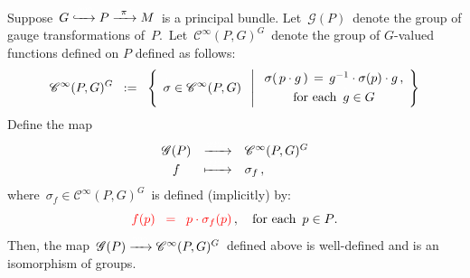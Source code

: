\vskip 0.5cm
\begin{proposition}
\mbox{}
\vskip -0.05cm
\noindent
Suppose
\,$G \xhookrightarrow{{\color{white}222}} P \xrightarrow{{\color{white}2}\pi{\color{white}2}} M$\,
is a principal bundle.
Let \,$\mathscr{G}(P)$\, denote the group of gauge transformations of \,$P$.\,
Let \,$\mathscr{C}^{\infty}(P,G)^{G}$\, denote the group of $G$-valued functions
defined on $P$ defined as follows:
\begin{equation*}
\mathscr{C}^{\infty}(P,G)^{G}
\;\; := \;\;
	\left\{\;\,
		\overset{{\color{white}1}}{\sigma} \in \mathscr{C}^{\infty}(P,G)
		\;\;\left\vert\;
		\begin{array}{c}
		\sigma(\,p \cdot g\,) \,=\, g^{-1} \cdot \sigma(p) \cdot g\,,
		\\
		\textnormal{for each \,$\overset{{\color{white}1}}{g} \in G$}
		\end{array}
		\right.
		\!\right\}
\end{equation*}
Define the map
\begin{equation*}
\begin{array}{ccl}
\mathscr{G}(P) & \xrightarrow{{\color{white}2222}} & \mathscr{C}^{\infty}(P,G)^{G}
\\
f & \xmapsto{{\color{white}2222}} & \sigma_{f}\,,
\end{array}
\end{equation*}
where \,$\sigma_{f} \in \mathscr{C}^{\infty}(P,G)^{G}$\, is defined (implicitly) by:
\begin{equation*}
{\color{red}
f(p)
\;\; = \;\;
	p \cdot \sigma_{f}(p)
	}\,,
\quad
\textnormal{for each \,$p \in P$}.
\end{equation*}
Then, the map
\,$\mathscr{G}(P) \xrightarrow{{\color{white}222}} \mathscr{C}^{\infty}(P,G)^{G}$\,
defined above is well-defined and is an isomorphism of groups.
\end{proposition}


